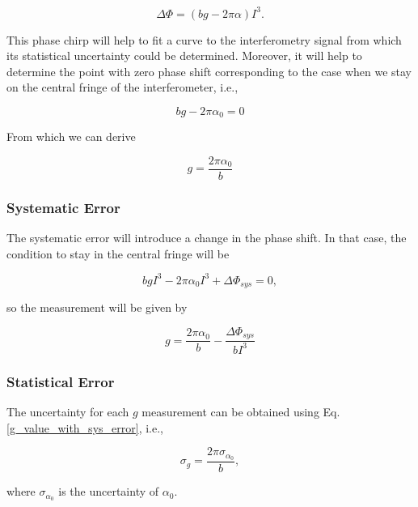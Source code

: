 \documentclass{article}
\begin{document}
\begin{equation}
    \Delta \Phi = (b g  - 2\pi \alpha) I^3.
\end{equation}

This phase chirp will help to fit a curve to the interferometry signal from which its statistical uncertainty could be determined. Moreover, it will help to determine the point with zero phase shift corresponding to the case when we stay on the central fringe of the interferometer, i.e.,

\begin{equation}
    b g  - 2\pi \alpha_{0} = 0
\end{equation}

From which we can derive

\begin{equation}
    g = \frac{2\pi \alpha_{0}}{b}
\end{equation}

\subsubsection{Systematic Error}
The systematic error will introduce a change in the phase shift. In that case, the condition to stay in the central fringe will be

\begin{equation}
    b g I^3 - 2\pi \alpha_{0} I^3 + \Delta \Phi_{sys}= 0,
\end{equation}

so the measurement will be given by

\begin{equation}\label{g_value_with_sys_error}
    g = \frac{2\pi \alpha_{0}}{b} - \frac{\Delta \Phi_{sys}}{b I^3}
\end{equation}

\subsubsection{Statistical Error}
The uncertainty for each $g$ measurement can be obtained using Eq. \ref{g_value_with_sys_error}, i.e.,

\begin{equation}
    \sigma_{g} = \frac{2\pi \sigma_{\alpha_{0}}}{b},
\end{equation}

where $\sigma_{\alpha_{0}}$ is the uncertainty of $\alpha_{0}$.



\end{document}
